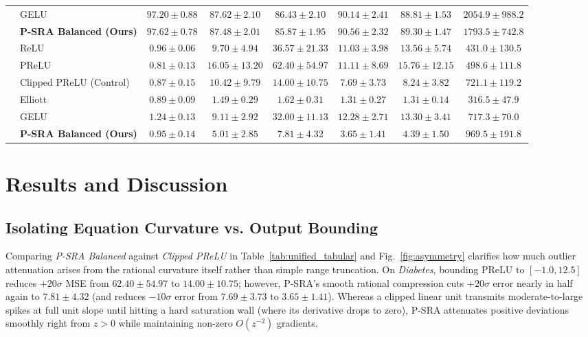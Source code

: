 \documentclass[conference]{IEEEtran}
\begin{document}
\begin{table}[t]
\begin{tabular}{llcccccc}
 & GELU & $97.20 \pm 0.88$ & $\mathbf{87.62 \pm 2.10}$ & $\mathbf{86.43 \pm 2.10}$ & $90.14 \pm 2.41$ & $88.81 \pm 1.53$ & $2054.9 \pm 988.2$ \\
 & \textbf{P-SRA Balanced (Ours)} & $\mathbf{97.62 \pm 0.78}$ & $87.48 \pm 2.01$ & $85.87 \pm 1.95$ & $90.56 \pm 2.32$ & $89.30 \pm 1.47$ & $1793.5 \pm 742.8$ \\
\midrule
{} 
 & ReLU & $0.96 \pm 0.06$ & $9.70 \pm 4.94$ & $36.57 \pm 21.33$ & $11.03 \pm 3.98$ & $13.56 \pm 5.74$ & $431.0 \pm 130.5$ \\
 & PReLU & $\mathbf{0.81 \pm 0.13}$ & $16.05 \pm 13.20$ & $62.40 \pm 54.97$ & $11.11 \pm 8.69$ & $15.76 \pm 12.15$ & $498.6 \pm 111.8$ \\
 & Clipped PReLU (Control) & $0.87 \pm 0.15$ & $10.42 \pm 9.79$ & $14.00 \pm 10.75$ & $7.69 \pm 3.73$ & $8.24 \pm 3.82$ & $721.1 \pm 119.2$ \\
 & Elliott & $0.89 \pm 0.09$ & $\mathbf{1.49 \pm 0.29}$ & $\mathbf{1.62 \pm 0.31}$ & $\mathbf{1.31 \pm 0.27}$ & $\mathbf{1.31 \pm 0.14}$ & $\mathbf{316.5 \pm 47.9}$ \\
 & GELU & $1.24 \pm 0.13$ & $9.11 \pm 2.92$ & $32.00 \pm 11.13$ & $12.28 \pm 2.71$ & $13.30 \pm 3.41$ & $717.3 \pm 70.0$ \\
 & \textbf{P-SRA Balanced (Ours)} & $0.95 \pm 0.14$ & $5.01 \pm 2.85$ & $7.81 \pm 4.32$ & $3.65 \pm 1.41$ & $4.39 \pm 1.50$ & $969.5 \pm 191.8$ \\
\bottomrule
\end{tabular}
\end{table}

\section{Results and Discussion}

\subsection{Isolating Equation Curvature vs. Output Bounding}
Comparing \textit{P-SRA Balanced} against \textit{Clipped PReLU} in Table~\ref{tab:unified_tabular} and Fig.~\ref{fig:asymmetry} clarifies how much outlier attenuation arises from the rational curvature itself rather than simple range truncation. On \textit{Diabetes}, bounding PReLU to $[-1.0, 12.5]$ reduces $+20\sigma$ MSE from $62.40 \pm 54.97$ to $14.00 \pm 10.75$; however, P-SRA's smooth rational compression cuts $+20\sigma$ error nearly in half again to $\mathbf{7.81 \pm 4.32}$ (and reduces $-10\sigma$ error from $7.69 \pm 3.73$ to $\mathbf{3.65 \pm 1.41}$). Whereas a clipped linear unit transmits moderate-to-large spikes at full unit slope until hitting a hard saturation wall (where its derivative drops to zero), P-SRA attenuates positive deviations smoothly right from $z > 0$ while maintaining non-zero $O(z^{-2})$ gradients.
\end{document}
